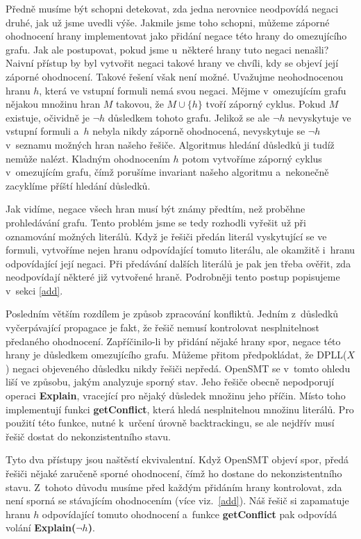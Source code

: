 Předně musíme být schopni detekovat, zda jedna nerovnice neodpovídá negaci druhé, jak už jsme uvedli výše. Jakmile jsme toho schopni, můžeme záporné ohodnocení hrany implementovat jako přidání negace této hrany do omezujícího grafu. Jak ale postupovat, pokud jsme u~některé hrany tuto negaci nenašli? Naivní přístup by byl vytvořit negaci takové hrany ve chvíli, kdy se objeví její záporné ohodnocení. Takové řešení však není možné. Uvažujme neohodnocenou hranu $h$, která ve vstupní formuli nemá svou negaci. Mějme v~omezujícím grafu nějakou množinu hran $M$ takovou, že $M \cup \{h\}$ tvoří záporný cyklus. Pokud $M$ existuje, očividně je $\neg h$ důsledkem tohoto grafu. Jelikož se ale $\neg h$ nevyskytuje ve vstupní formuli a~$h$ nebyla nikdy záporně ohodnocená, nevyskytuje se $\neg h$ v~seznamu možných hran našeho řešiče. Algoritmus hledání důsledků ji tudíž nemůže nalézt. Kladným ohodnocením $h$ potom vytvoříme záporný cyklus v~omezujícím grafu, čímž porušíme invariant našeho algoritmu a~nekonečně zacyklíme příští hledání důsledků.

Jak vidíme, negace všech hran musí být známy předtím, než proběhne prohledávání grafu. Tento problém jsme se tedy rozhodli vyřešit už při oznamování možných literálů. Když je řešiči předán literál vyskytující se ve formuli, vytvoříme nejen hranu odpovídající tomuto literálu, ale okamžitě i~hranu odpovídající její negaci. Při předávání dalších literálů je pak jen třeba ověřit, zda neodpovídají některé již vytvořené hraně. Podrobněji tento postup popisujeme v~sekci \ref{add}.

Posledním větším rozdílem je způsob zpracování konfliktů. Jedním z~důsledků vyčerpávající propagace je fakt, že řešič nemusí kontrolovat nesplnitelnost předaného ohodnocení. Zapříčinilo-li by přidání nějaké hrany spor, negace této hrany je důsledkem omezujícího grafu. Můžeme přitom předpokládat, že DPLL($X$) negaci objeveného důsledku nikdy řešiči nepředá. OpenSMT se v~tomto ohledu liší ve způsobu, jakým analyzuje sporný stav. Jeho řešiče obecně nepodporují operaci \textbf{Explain}, vracející pro nějaký důsledek množinu jeho příčin. Místo toho implementují funkci \textbf{getConflict}, která hledá nesplnitelnou množinu literálů. Pro použití této funkce, nutné k~určení úrovně backtrackingu, se ale nejdřív musí řešič dostat do nekonzistentního stavu.

Tyto dva přístupy jsou naštěstí ekvivalentní. Když OpenSMT objeví spor, předá řešiči nějaké zaručeně sporné ohodnocení, čímž ho dostane do nekonzistentního stavu. Z~tohoto důvodu musíme před každým přidáním hrany kontrolovat, zda není sporná se stávajícím ohodnocením (více viz.~\ref{add}). Náš řešič si zapamatuje hranu $h$ odpovídající tomuto ohodnocení a~funkce \textbf{getConflict} pak odpovídá volání \textbf{Explain($\neg h$)}. 

